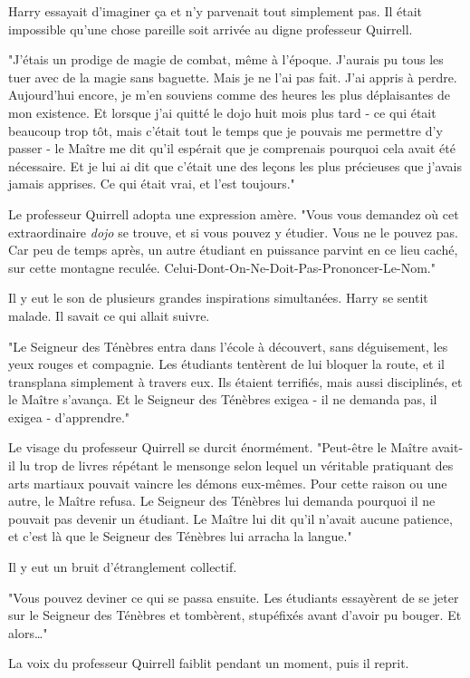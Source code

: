Harry essayait d'imaginer ça et n'y parvenait tout simplement pas. Il était impossible qu'une chose pareille soit arrivée au digne professeur Quirrell.

"J'étais un prodige de magie de combat, même à l'époque. J'aurais pu tous les tuer avec de la magie sans baguette. Mais je ne l'ai pas fait. J'ai appris à perdre. Aujourd'hui encore, je m'en souviens comme des heures les plus déplaisantes de mon existence. Et lorsque j'ai quitté le dojo huit mois plus tard - ce qui était beaucoup trop tôt, mais c'était tout le temps que je pouvais me permettre d'y passer - le Maître me dit qu'il espérait que je comprenais pourquoi cela avait été nécessaire. Et je lui ai dit que c'était une des leçons les plus précieuses que j'avais jamais apprises. Ce qui était vrai, et l'est toujours."

Le professeur Quirrell adopta une expression amère. "Vous vous demandez où cet extraordinaire \emph{dojo} se trouve, et si vous pouvez y étudier. Vous ne le pouvez pas. Car peu de temps après, un autre étudiant en puissance parvint en ce lieu caché, sur cette montagne reculée. Celui-Dont-On-Ne-Doit-Pas-Prononcer-Le-Nom."

Il y eut le son de plusieurs grandes inspirations simultanées. Harry se sentit malade. Il savait ce qui allait suivre.

"Le Seigneur des Ténèbres entra dans l'école à découvert, sans déguisement, les yeux rouges et compagnie. Les étudiants tentèrent de lui bloquer la route, et il transplana simplement à travers eux. Ils étaient terrifiés, mais aussi disciplinés, et le Maître s'avança. Et le Seigneur des Ténèbres exigea - il ne demanda pas, il exigea - d'apprendre."

Le visage du professeur Quirrell se durcit énormément. "Peut-être le Maître avait-il lu trop de livres répétant le mensonge selon lequel un véritable pratiquant des arts martiaux pouvait vaincre les démons eux-mêmes. Pour cette raison ou une autre, le Maître refusa. Le Seigneur des Ténèbres lui demanda pourquoi il ne pouvait pas devenir un étudiant. Le Maître lui dit qu'il n'avait aucune patience, et c'est là que le Seigneur des Ténèbres lui arracha la langue."

Il y eut un bruit d'étranglement collectif.

"Vous pouvez deviner ce qui se passa ensuite. Les étudiants essayèrent de se jeter sur le Seigneur des Ténèbres et tombèrent, stupéfixés avant d'avoir pu bouger. Et alors…"

La voix du professeur Quirrell faiblit pendant un moment, puis il reprit.

